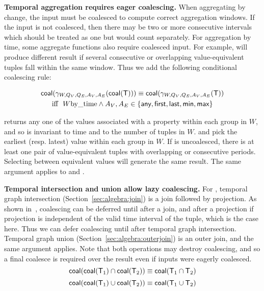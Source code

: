 {\bf Temporal aggregation requires eager coalescing.}  When
aggregating by change, the input must be coalesced to compute correct
aggregation windows.  If the input is not coalesced, then there may be
two or more consecutive intervals which should be treated as one but
would count separately. For aggregation by time, some aggregate
functions also require coalesced input.  For example, 
will produce different result if several consecutive or overlapping
value-equivalent tuples fall within the same window.  Thus we add the
following conditional coalescing rule:
\begin{fleqn}[0pt]
\begin{multline}
\textsf{coal}(\gamma_{W,Q_V,Q_E,A_V,A_E}(\textsf{coal}(\mathsf{T}))) \equiv \textsf{coal}(\gamma_{W,Q_V,Q_E,A_V,A_E}(\mathsf{T})) \\
\text{iff}~~W \text{by\_time} \wedge A_V, A_E \in \{\textsf{any},\textsf{first}, \textsf{last},\textsf{min}, \textsf{max} \}
\label{rul:agg}
\end{multline}
\end{fleqn}

 returns any one of the values associated with a property
within each group in $W$, and so is invariant to time and to the
number of tuples in $W$.   and  pick the
earliest (resp. latest) value within each group in $W$.  If \ttt is
uncoalesced, there is at least one pair of value-equivalent tuples
with overlapping or consecutive periods.  Selecting between equivalent
values will generate the same result.  The same argument applies to
 and .

{\bf Temporal intersection and union allow lazy coalescing.} For \trg,
temporal graph intersection (Section~\ref{sec:algebra:join}) is a join
followed by projection.  As shown in~\cite{DBLP:conf/vldb/BohlenSS96},
coalescing can be deferred until after a join, and after a projection
if projection is independent of the valid time interval of the tuple,
which is the case here.  Thus we can defer coalescing until after
temporal graph intersection.  Temporal graph union
(Section~\ref{sec:algebra:outerjoin}) is an outer join, and the same
argument applies.  Note that both operations may destroy coalescing,
and so a final coalesce is required over the result even if inputs
were eagerly coalesced.
\begin{equation}
\textsf{coal}(\textsf{coal}(\mathsf{T}_1) \cap \textsf{coal}(\mathsf{T}_2)) \equiv \textsf{coal}(\mathsf{T}_1 \cap \mathsf{T}_2)
\label{rul:intersect}
\end{equation}
\begin{equation}
\textsf{coal}(\textsf{coal}(\mathsf{T}_1) \cup \textsf{coal}(\mathsf{T}_2)) \equiv \textsf{coal}(\mathsf{T}_1 \cup \mathsf{T}_2)
\label{rul:union}
\end{equation}

